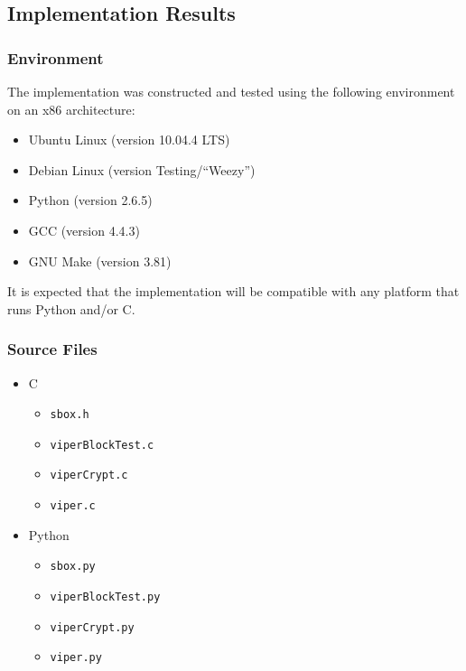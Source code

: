 \subsection{Implementation Results}

\subsubsection{Environment}


The implementation was constructed and tested using the following environment on an x86 architecture:
\begin{itemize}
\item Ubuntu Linux (version 10.04.4 LTS)
\item Debian Linux (version Testing/\enquote{Weezy})
\item Python (version 2.6.5)
\item GCC (version 4.4.3)
\item GNU Make (version 3.81)
\end{itemize}

It is expected that the implementation will be compatible with any platform that runs Python and/or C.

\subsubsection{Source Files}
\begin{itemize}
\item C
	\begin{itemize}
	\item \texttt{sbox.h}
	\item \texttt{viperBlockTest.c}
	\item \texttt{viperCrypt.c}
	\item \texttt{viper.c}
	\end{itemize}
\item Python
	\begin{itemize}
	\item \texttt{sbox.py}
	\item \texttt{viperBlockTest.py}
	\item \texttt{viperCrypt.py}
	\item \texttt{viper.py}
	\end{itemize}
\end{itemize}

